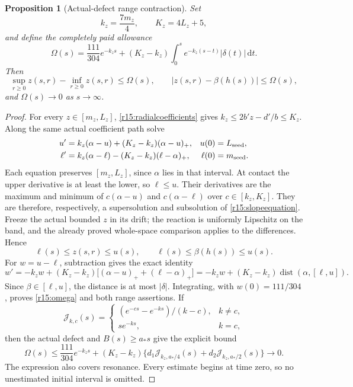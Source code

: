 \documentclass[11pt]{article}
\numberwithin{equation}{section}
\newtheorem{proposition}[theorem]{Proposition}
\newcommand{\dd}{\,\mathrm d}
\begin{document}
\begin{proposition}[Actual-defect range contraction]\label{r15:squeeze}
Set
\[
 k_z=\frac{7m_z}{4},\qquad K_z=4L_z+5,
\]
and define the completely paid allowance
\begin{equation}\label{r15:omega}
 \Omega(s)=\frac{111}{304}e^{-k_zs}
 +(K_z-k_z)\int_0^s e^{-k_z(s-t)}|\delta(t)|\dd t.
\end{equation}
Then
\[
 \sup_{r\ge0}z(s,r)-\inf_{r\ge0}z(s,r)\le\Omega(s),\qquad
 |z(s,r)-\beta(h(s))|\le\Omega(s),
\]
and $\Omega(s)\to0$ as $s\to\infty$.
\end{proposition}
\begin{proof}
For every $z\in[m_z,L_z]$, \eqref{r15:radialcoefficients} gives
$k_z\le2b'z-d'/b\le K_z$. Along the same actual coefficient path solve
\begin{align*}
 u'&=k_z(\alpha-u)+(K_z-k_z)(\alpha-u)_+,
 &u(0)&=L_{\rm seed},\\
 \ell'&=k_z(\alpha-\ell)-(K_z-k_z)(\ell-\alpha)_+,
 &\ell(0)&=m_{\rm seed}.
\end{align*}
Each equation preserves $[m_z,L_z]$, since $\alpha$ lies in that
interval. At contact the upper derivative is at least the lower, so
$\ell\le u$. Their derivatives are the maximum and minimum of
$c(\alpha-u)$ and $c(\alpha-\ell)$ over $c\in[k_z,K_z]$.
They are therefore, respectively, a supersolution and subsolution of
\eqref{r15:slopeequation}. Freeze the actual bounded $z$ in its drift;
the reaction is uniformly Lipschitz on the band, and the already proved
whole-space comparison applies to the differences. Hence
\[
 \ell(s)\le z(s,r)\le u(s),\qquad
 \ell(s)\le\beta(h(s))\le u(s).
\]
For $w=u-\ell$, subtraction gives the exact identity
\[
 w'=-k_zw+(K_z-k_z)
       \big[(\alpha-u)_++(\ell-\alpha)_+\big]
 =-k_zw+(K_z-k_z)\operatorname{dist}(\alpha,[\ell,u]).
\]
Since $\beta\in[\ell,u]$, the distance is at most $|\delta|$.
Integrating, with $w(0)=111/304$, proves \eqref{r15:omega} and both
range assertions. If
\[
 \mathscr J_{k,c}(s)=
 \begin{cases}
 (e^{-cs}-e^{-ks})/(k-c),&k\ne c,\\
 se^{-ks},&k=c,
 \end{cases}
\]
then the actual defect and $B(s)\ge a_*s$ give the explicit bound
\begin{equation}\label{r15:omegadecay}
 \Omega(s)\le\frac{111}{304}e^{-k_zs}
 +(K_z-k_z)\{d_1\mathscr J_{k_z,a_*/4}(s)
                  +d_2\mathscr J_{k_z,a_*/2}(s)\}\longrightarrow0.
\end{equation}
The expression also covers resonance. Every estimate begins at time
zero, so no unestimated initial interval is omitted.
\end{proof}
\end{document}
